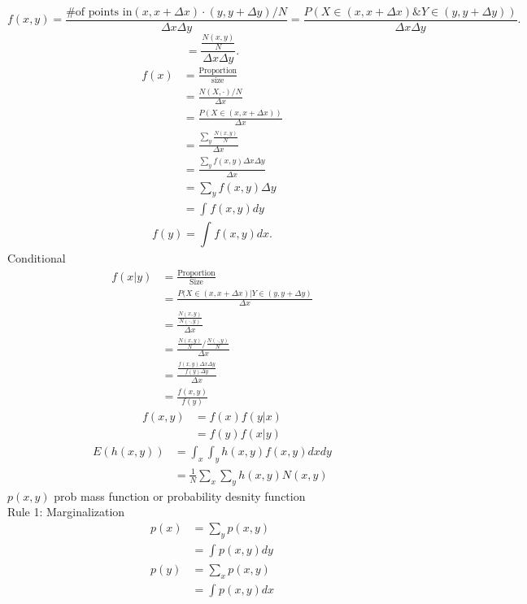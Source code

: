 \documentclass{article}
\begin{document}
   \[
       f(x,y) = \frac{\text{\# of points in} (x, x+\Delta x) \cdot  (y, y + \Delta y) / N}{\Delta x\Delta y  } = \frac{P(X \in (x, x + \Delta x) \&  Y \in (y, y + \Delta y))}{\Delta x\Delta y  }  
   .\]    
   \[
   = \frac{\frac{N(x,y)}{N}}{\Delta x\Delta y  }
   .\] 
   \begin{align*}
       f(x) &= \frac{\text{Proportion}}{\text{size}}\\
            &= \frac{N(X,\cdot ) / N}{\Delta x } \\
            &= \frac{P(X \in (x, x+\Delta x))}{\Delta x } \\
            &= \frac{\sum_{y}^{}\frac{N(x,y)}{N}}{\Delta x }\\
            &= \frac{\sum_{y}^{}f(x,y)\Delta x\Delta y}{\Delta x }\\
            &= \sum_{y}^{}f(x,y)\Delta y \\
            &= \int_{}^{}f(x,y)dy
   \end{align*}
   \[
   f(y) = \int_{}^{}f(x,y)dx
   .\] 
   Conditional
   \begin{align*}
       f(x|y) &= \frac{\text{Proportion}}{\text{Size}}\\
              &= \frac{P(X \in (x, x+\Delta x)| Y \in (y,y+\Delta y )}{\Delta x }\\
              &= \frac{\frac{N(x,y)}{N(\cdot ,y)}}{\Delta x }\\
              &= \frac{\frac{N(x,y)}{N} / \frac{N(\cdot ,y)}{N}}{\Delta x }\\
              &= \frac{\frac{f(x,y)\Delta x\Delta y}{f(y)\Delta y }}{\Delta x }\\
              &= \frac{f(x,y)}{f(y)}
   \end{align*}
   \begin{align*}
       f(x,y) &= f(x)f(y|x) \\
              &= f(y)f(x|y)
   \end{align*}
   \begin{align*}
       E(h(x,y)) &= \int_{x}^{}\int_{y}^{}h(x,y)f(x,y)dxdy\\
                 &= \frac{1}{N} \sum_{x}^{}\sum_{y}^{}h(x,y)N(x,y)
   \end{align*}
   $p(x,y)$ prob mass function or probability desnity function\\
   Rule 1: Marginalization
    \begin{align*}
        p(x) &= \sum_{y}^{}p(x,y)\\
             &= \int_{}^{}p(x,y)dy\\
        p(y) &= \sum_{x}^{}p(x,y)\\
             &= \int_{}^{}p(x,y)dx
   \end{align*}
\end{document}
